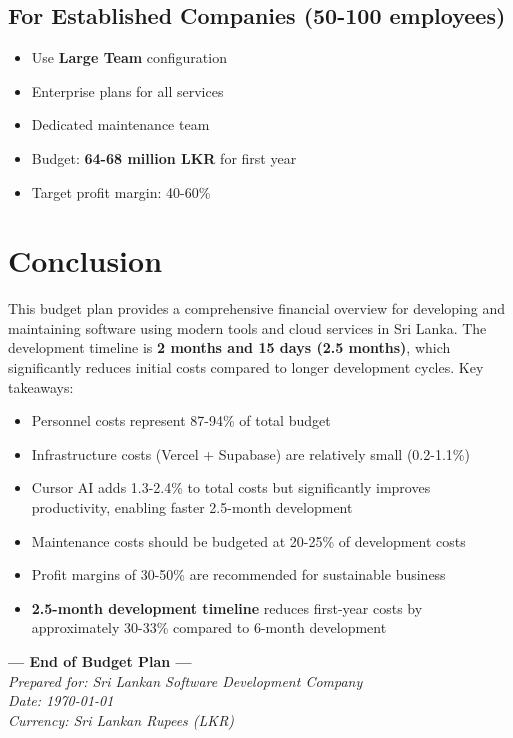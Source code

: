 \documentclass[12pt,a4paper]{article}
\begin{document}
\subsection{For Established Companies (50-100 employees)}

\begin{itemize}
    \item Use \textbf{Large Team} configuration
    \item Enterprise plans for all services
    \item Dedicated maintenance team
    \item Budget: \textbf{64-68 million LKR} for first year
    \item Target profit margin: 40-60\%
\end{itemize}

\section{Conclusion}

This budget plan provides a comprehensive financial overview for developing and maintaining software using modern tools and cloud services in Sri Lanka. The development timeline is \textbf{2 months and 15 days (2.5 months)}, which significantly reduces initial costs compared to longer development cycles. Key takeaways:

\begin{itemize}
    \item Personnel costs represent 87-94\% of total budget
    \item Infrastructure costs (Vercel + Supabase) are relatively small (0.2-1.1\%)
    \item Cursor AI adds 1.3-2.4\% to total costs but significantly improves productivity, enabling faster 2.5-month development
    \item Maintenance costs should be budgeted at 20-25\% of development costs
    \item Profit margins of 30-50\% are recommended for sustainable business
    \item \textbf{2.5-month development timeline} reduces first-year costs by approximately 30-33\% compared to 6-month development
\end{itemize}

\vspace{1cm}

\begin{center}
\textbf{--- End of Budget Plan ---}\\
\vspace{0.5cm}
\textit{Prepared for: Sri Lankan Software Development Company}\\
\textit{Date: \today}\\
\textit{Currency: Sri Lankan Rupees (LKR)}
\end{center}
\end{document}
